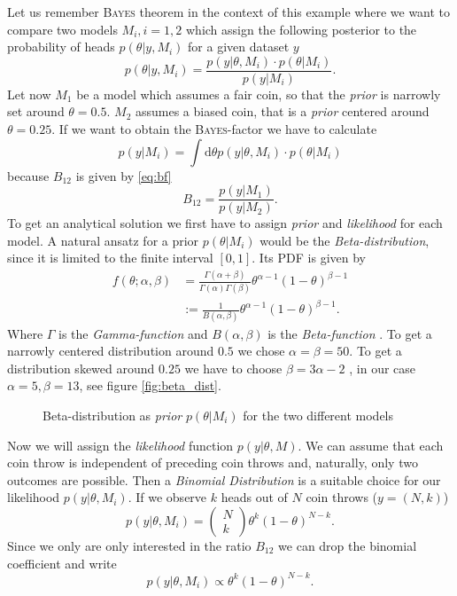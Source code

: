\documentclass[%
 reprint,
 amsmath,amssymb,
 aps,
]{revtex4-1}
\begin{document}
Let us remember \textsc{Bayes} theorem in the context of this example where we want to compare two models $M_i,i=1,2$ which assign the following posterior to the probability of heads $p(\theta|y,M_i)$ for a given dataset $y$
$$p(\theta|y,M_i)=\frac{p(y|\theta,M_i)\cdot p(\theta|M_i)}{p(y|M_i)}.$$
Let now $M_1$ be a model which assumes a fair coin, so that the \emph{prior} is narrowly set around $\theta=0.5$. $M_2$ assumes a biased coin, that is a \emph{prior} centered around $\theta =0.25$. If we want to obtain the \textsc{Bayes}-factor we have to calculate $$p(y|M_i)=\int \text{d}\theta p(y|\theta,M_i)\cdot p(\theta|M_i) $$
because $B_{12}$ is given by \eqref{eq:bf} $$B_{12}=\frac{p(y|M_1)}{p(y|M_2)}.$$
To get an analytical solution we first have to assign \emph{prior} and \emph{likelihood} for each model. A natural ansatz for a prior $p(\theta|M_i)$ would be the \emph{Beta-distribution}, since it is limited to the finite interval $[0,1]$. Its PDF is given by \cite{kormaz} \begin{align*}f(\theta;\alpha,\beta)&=\frac{\Gamma(\alpha+\beta)}{\Gamma(\alpha)\Gamma(\beta)}\theta^{\alpha-1}(1-\theta)^{\beta-1}\\&:=\frac{1}{B(\alpha,\beta)}\theta^{\alpha-1}(1-\theta)^{\beta-1}.
\end{align*}
Where $\Gamma$ is the \emph{Gamma-function} \cite{gamma_function} and $B(\alpha,\beta)$ is the \emph{Beta-function} \cite{beta_function}.
To get a narrowly centered distribution around $0.5$ we chose $\alpha=\beta=50$. To get a distribution skewed around $0.25$ we have to choose $\beta=3\alpha-2$ \cite{wiki}, in our case $\alpha=5,\beta=13$, see figure \eqref{fig:beta_dist}.
\begin{figure}[htbp]
	\centering
	\caption{Beta-distribution as \emph{prior} $p(\theta|M_i)$ for the two different models}
	\label{fig:beta_dist}
\end{figure}
Now we will assign the \emph{likelihood} function $p(y|\theta,M)$. We can assume that each coin throw is independent of preceding coin throws and, naturally, only two outcomes are possible. Then a \emph{Binomial Distribution} is a suitable choice for our likelihood $p(y|\theta,M_i)$. If we observe $k$ heads out of $N$ coin throws ($y=(N,k)$) $$p(y|\theta,M_i)=\begin{pmatrix}N\\k
\end{pmatrix}\theta^k(1-\theta)^{N-k}.$$
Since we only are only interested in the ratio $B_{12}$ we can drop the binomial coefficient and write $$p(y|\theta, M_i)\propto \theta^k(1-\theta)^{N-k}.$$
\end{document}
